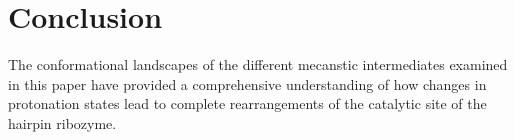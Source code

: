 \documentclass[journal=jacsat,manuscript=article]{achemso}
\begin{document}
\section{Conclusion}

The conformational landscapes of the different mecanstic intermediates examined in this paper have provided a comprehensive understanding of how changes in protonation states lead to complete rearrangements of the catalytic site of the hairpin ribozyme. 





\end{document}
